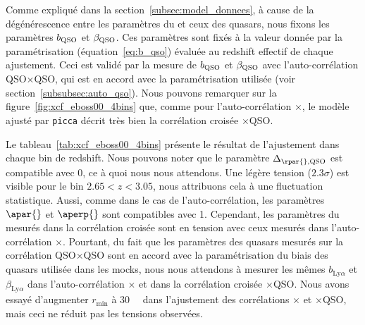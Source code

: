 Comme expliqué dans la section~\ref{subsec:model_donnees}, à cause de la dégénérescence entre les paramètres du \lya{} et ceux des quasars, nous fixons les paramètres $b_{\textsc{QSO}}$ et $\beta_{\textsc{QSO}}$. Ces paramètres sont fixés à la valeur donnée par la paramétrisation (équation~\ref{eq:b_qso}) évaluée au redshift effectif de chaque ajustement. Ceci est validé par la mesure de $b_{\textsc{QSO}}$ et $\beta_{\textsc{QSO}}$ avec l'auto-corrélation QSO$\times$QSO, qui est en accord avec la paramétrisation utilisée (voir section~\ref{subsubsec:auto_qso}).
Nous pouvons remarquer sur la figure~\ref{fig:xcf_eboss00_4bins} que, comme pour l'auto-corrélation \lya$\times$\lya{}, le modèle ajusté par \texttt{picca} décrit très bien la corrélation croisée \lya{}$\times$QSO.

Le tableau~\ref{tab:xcf_eboss00_4bins} présente le résultat de l'ajustement dans chaque bin de redshift.
Nous pouvons noter que le paramètre $\Delta_{\rpar{}, \textsc{QSO}}$ est compatible avec 0, ce à quoi nous nous attendons. Une légère tension ($\num{2.3}\sigma$) est visible pour le bin $\num{2.65} < z < \num{3.05}$, nous attribuons cela à une fluctuation statistique.
Aussi, comme dans le cas de l'auto-corrélation, les paramètres $\apar{}$ et $\aperp{}$ sont compatibles avec 1.
Cependant, les paramètres du \lya{} mesurés dans la corrélation croisée sont en tension avec ceux mesurés dans l'auto-corrélation \lya{}$\times$\lya{}. Pourtant, du fait que les paramètres des quasars mesurés sur la corrélation QSO$\times$QSO sont en accord avec la paramétrisation du biais des quasars utilisée dans les mocks, nous nous attendons à mesurer les mêmes $b_{\mathrm{Ly}\alpha}$ et $\beta_{\mathrm{Ly}\alpha}$ dans l'auto-corrélation \lya{}$\times$\lya{} et dans la corrélation croisée \lya{}$\times$QSO.
Nous avons essayé d'augmenter $r_{\mathrm{min}}$ à \SI{30}{\perh\Mpc} dans l'ajustement des corrélations \lya{}$\times$\lya{} et \lya{}$\times$QSO, mais ceci ne réduit pas les tensions observées.

